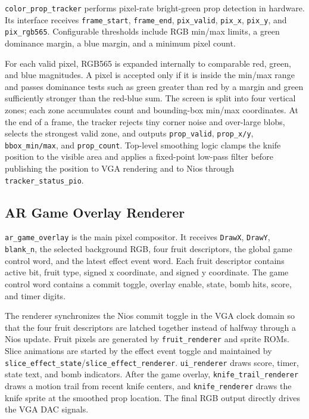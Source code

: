\documentclass[10pt]{article}
\begin{document}
\texttt{color\_prop\_tracker} performs pixel-rate bright-green prop detection in hardware. Its interface receives \texttt{frame\_start}, \texttt{frame\_end}, \texttt{pix\_valid}, \texttt{pix\_x}, \texttt{pix\_y}, and \texttt{pix\_rgb565}. Configurable thresholds include RGB min/max limits, a green dominance margin, a blue margin, and a minimum pixel count.

For each valid pixel, RGB565 is expanded internally to comparable red, green, and blue magnitudes. A pixel is accepted only if it is inside the min/max range and passes dominance tests such as green greater than red by a margin and green sufficiently stronger than the red-blue sum. The screen is split into four vertical zones; each zone accumulates count and bounding-box min/max coordinates. At the end of a frame, the tracker rejects tiny corner noise and over-large blobs, selects the strongest valid zone, and outputs \texttt{prop\_valid}, \texttt{prop\_x/y}, \texttt{bbox\_min/max}, and \texttt{prop\_count}. Top-level smoothing logic clamps the knife position to the visible area and applies a fixed-point low-pass filter before publishing the position to VGA rendering and to Nios through \texttt{tracker\_status\_pio}.

\subsection{AR Game Overlay Renderer}

\texttt{ar\_game\_overlay} is the main pixel compositor. It receives \texttt{DrawX}, \texttt{DrawY}, \texttt{blank\_n}, the selected background RGB, four fruit descriptors, the global game control word, and the latest effect event word. Each fruit descriptor contains active bit, fruit type, signed x coordinate, and signed y coordinate. The game control word contains a commit toggle, overlay enable, state, bomb hits, score, and timer digits.

The renderer synchronizes the Nios commit toggle in the VGA clock domain so that the four fruit descriptors are latched together instead of halfway through a Nios update. Fruit pixels are generated by \texttt{fruit\_renderer} and sprite ROMs. Slice animations are started by the effect event toggle and maintained by \texttt{slice\_effect\_state}/\texttt{slice\_effect\_renderer}. \texttt{ui\_renderer} draws score, timer, state text, and bomb indicators. After the game overlay, \texttt{knife\_trail\_renderer} draws a motion trail from recent knife centers, and \texttt{knife\_renderer} draws the knife sprite at the smoothed prop location. The final RGB output directly drives the VGA DAC signals.
\end{document}
